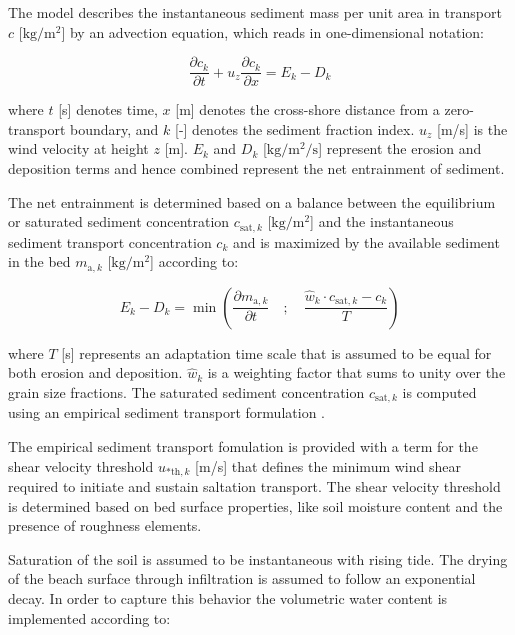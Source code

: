 The model describes the instantaneous sediment mass per unit area in
transport $c$ [$\mathrm{kg/m^2}$] by an advection equation, which
reads in one-dimensional notation:

\begin{equation}
  \label{eq:advection}
  \frac{\partial c_k}{\partial t} + u_z \frac{\partial c_k}{\partial x} = E_k - D_k
\end{equation}

\noindent where $t$ [s] denotes time, $x$ [m] denotes the cross-shore
distance from a zero-transport boundary, and $k$ [-] denotes the
sediment fraction index. $u_z$ [m/s] is the wind velocity at height
$z$ [m]. $E_k$ and $D_k$ [$\mathrm{kg/m^2/s}$] represent the erosion
and deposition terms and hence combined represent the net entrainment
of sediment.

The net entrainment is determined based on a balance between the
equilibrium or saturated sediment concentration $c_{\mathrm{sat},k}$
[$\mathrm{kg/m^2}$] and the instantaneous sediment transport
concentration $c_k$ and is maximized by the available sediment in the
bed $m_{\mathrm{a},k}$ [$\mathrm{kg/m^2}$] according to:

\begin{equation}
  \label{eq:erodep}
  E_k - D_k = \min \left ( \frac{\partial m_{\mathrm{a},k}}{\partial t} \quad ; \quad \frac{\hat{w}_k \cdot c_{\mathrm{sat},k} - c_k}{T} \right )
\end{equation}

\noindent where $T$ [s] represents an adaptation time scale that is
assumed to be equal for both erosion and deposition. $\hat{w}_k$ is a
weighting factor that sums to unity over the grain size fractions. The
saturated sediment concentration $c_{\mathrm{sat},k}$ is computed
using an empirical sediment transport formulation
\citep[e.g.][]{Bagnold1937a}.

The empirical sediment transport fomulation is provided with a term
for the shear velocity threshold $u_{\mathrm{* th},k}$ [m/s] that
defines the minimum wind shear required to initiate and sustain
saltation transport. The shear velocity threshold is determined based
on bed surface properties, like soil moisture content and the presence
of roughness elements.

Saturation of the soil is assumed to be instantaneous with rising
tide. The drying of the beach surface through infiltration is assumed
to follow an exponential decay. In order to capture this behavior the
volumetric water content is implemented according to:

